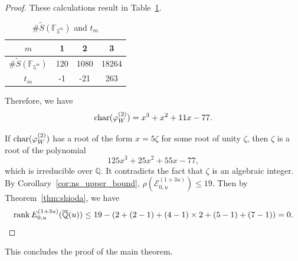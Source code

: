 \documentclass[main]{subfiles}
\begin{document}
\begin{proof}
    These calculations result in Table~\ref{tab:tm}.
    \begin{table}[H]
        \centering
        \caption{$\# \tilde{S}(\mathbb{F}_{5^{m}})$ and $t_{m}$}
        \begin{tabular}{|c|c|c|c|}
            \hline
            $m$                              & 1   & 2    & 3     \\
            \hline
            $\# \tilde{S}(\mathbb{F}_{5^m})$ & 120 & 1080 & 18264 \\
            \hline
            $t_m$                            & -1  & -21  & 263   \\
            \hline
        \end{tabular}
        \label{tab:tm}
    \end{table}

    Therefore, we have
    \begin{equation*}
        \operatorname{char}(\varphi_{W}^{(2)}) = x^{3} + x^{2} + 11 x - 77.
    \end{equation*}

    If $\operatorname{char} (\varphi_{W}^{(2)})$ has a root of the form $x=5 \zeta$ for some root of unity $\zeta$, then $\zeta$ is a root of the polynomial
    \begin{equation*}
        125x^{3} + 25x^{2} + 55 x - 77,
    \end{equation*}
    which is irreducible over $\mathbb{Q}$.
    It contradicts the fact that $\zeta$ is an algebraic integer.
    By Corollary~\ref{cor:ns_upper_bound}, $\rho(\mathcal{E}_{0,u}^{(1 + 3u)}) \leq 19$.
    Then by Theorem~\ref{thm:shioda}, we have
    \begin{equation*}
        \operatorname{rank} E_{0,u}^{(1 + 3u)}(\overline{\mathbb{Q}}(u)) \leq 19 - (2 + (2 - 1) + (4 - 1) \times 2 + (5 - 1) + (7 - 1)) = 0.
    \end{equation*}
\end{proof}

This concludes the proof of the main theorem.
\end{document}
